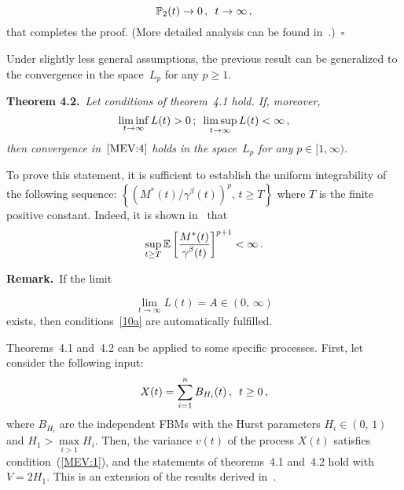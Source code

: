 \begin{multicols}{2}
\noindent
$$
\P_2(t) \to 0\,,\enskip  t \to \infty\,,
$$
that completes  the proof.  (More detailed analysis can be found in~\cite{Luk1}.)~\hfill$\square$

\smallskip

Under  slightly less general  assumptions, the  previous result can
be generalized  to the convergence in the  space~$L_p$ for any $p\ge 1$.


\smallskip

\noindent
\textbf{Theorem 4.2.}\
\textit{Let conditions of  theorem~4.1 hold.  If,
moreover,
\begin{equation}
\liminf_{t\to \infty} L(t)>0\,;\enskip \limsup\limits_{t\to \infty} L(t)<\infty\,,
\label{10a}
\end{equation}
then convergence in~$\eqref{MEV:4}$ holds in the space~$L_p$  for any}
$p \in [1,\infty)$.


\smallskip

To prove this statement, it is sufficient to establish the uniform
integrability of the following sequence:\linebreak
$\left\{\left({ M^*(t)}/{\gamma^\beta(t)}\right)^p,\,t\ge T\right\}$
where $T$ is the finite positive constant. Indeed, it is shown
in~\cite{Luk2} that
\begin{equation*}
\sup\limits_{t \geq T} \E \left[
\fr{M^*(t)}{\gamma^\beta(t)} \right]^{p+1} < \infty\,.
\end{equation*}


\noindent
\textbf{Remark.}\
If the  limit

\noindent
\begin{equation*}
\lim\limits_{t\to \infty} L(t)= A\in (0,\,\infty)
\end{equation*}
 exists, then conditions~\eqref{10a} are automatically fulfilled.


\smallskip

Theorems~4.1 and~4.2 can be applied to some specific
processes.  First, let  consider the following input:
\begin{equation*}
X(t)=\sum\limits_{i=1}^n B_{H_i}(t)\,,\enskip t\ge 0\,,
\end{equation*}
where $B_{H_i}$ are the independent FBMs with the Hurst parameters
$H_i\in(0,\,1)$ and  $H_1>\max\limits_{i>1}H_i$. Then,  the variance
$v(t)$ of the process $X(t)$ satisfies condition~(\ref{MEV:1}), and
 the statements of theorems~4.1 and~4.2 hold  with $V=2H_1$.
 This is an extension of the results derived in~\cite{Zeevi}.


\end{multicols}
